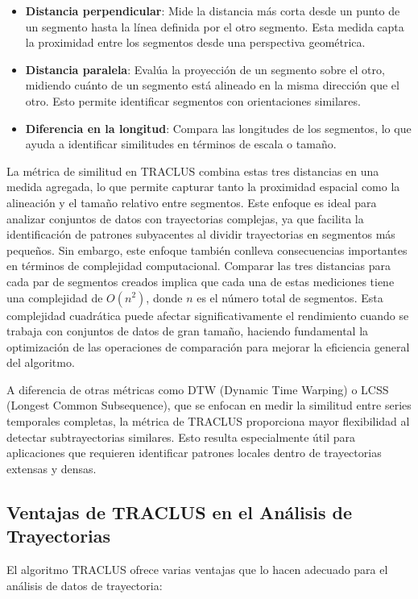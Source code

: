 \begin{itemize}
    \item \textbf{Distancia perpendicular}: Mide la distancia más corta desde un punto de un segmento hasta la línea definida por el otro segmento. Esta medida capta la proximidad entre los segmentos desde una perspectiva geométrica.
    \item \textbf{Distancia paralela}: Evalúa la proyección de un segmento sobre el otro, midiendo cuánto de un segmento está alineado en la misma dirección que el otro. Esto permite identificar segmentos con orientaciones similares.
    \item \textbf{Diferencia en la longitud}: Compara las longitudes de los segmentos, lo que ayuda a identificar similitudes en términos de escala o tamaño.
\end{itemize}

La métrica de similitud en TRACLUS combina estas tres distancias en una medida agregada, lo que permite capturar tanto la proximidad espacial como la alineación y el tamaño relativo entre segmentos. Este enfoque es ideal para analizar conjuntos de datos con trayectorias complejas, ya que facilita la identificación de patrones subyacentes al dividir trayectorias en segmentos más pequeños. Sin embargo, este enfoque también conlleva consecuencias importantes en términos de complejidad computacional. Comparar las tres distancias para cada par de segmentos creados implica que cada una de estas mediciones tiene una complejidad de \(O(n^2)\), donde \(n\) es el número total de segmentos. Esta complejidad cuadrática puede afectar significativamente el rendimiento cuando se trabaja con conjuntos de datos de gran tamaño, haciendo fundamental la optimización de las operaciones de comparación para mejorar la eficiencia general del algoritmo.

A diferencia de otras métricas como DTW (Dynamic Time Warping) o LCSS (Longest Common Subsequence), que se enfocan en medir la similitud entre series temporales completas, la métrica de TRACLUS proporciona mayor flexibilidad al detectar subtrayectorias similares. Esto resulta especialmente útil para aplicaciones que requieren identificar patrones locales dentro de trayectorias extensas y densas.

\subsection*{Ventajas de TRACLUS en el Análisis de Trayectorias}
El algoritmo TRACLUS ofrece varias ventajas que lo hacen adecuado para el análisis de datos de trayectoria:


